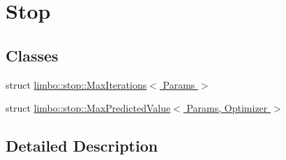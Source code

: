 \hypertarget{group__stop}{}\section{Stop}
\label{group__stop}
\subsection*{Classes}
\begin{DoxyCompactItemize}
\item 
struct \hyperlink{structlimbo_1_1stop_1_1_max_iterations}{limbo\+::stop\+::\+Max\+Iterations$<$ Params $>$}
\item 
struct \hyperlink{structlimbo_1_1stop_1_1_max_predicted_value}{limbo\+::stop\+::\+Max\+Predicted\+Value$<$ Params, Optimizer $>$}
\end{DoxyCompactItemize}


\subsection{Detailed Description}
